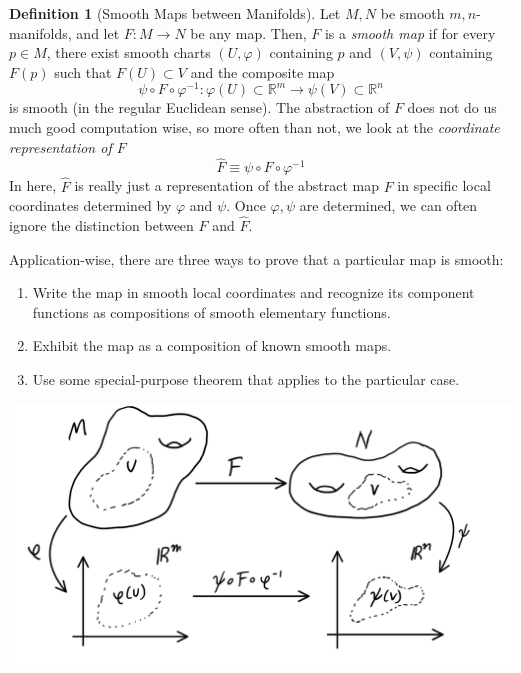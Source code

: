 \documentclass{article}
\theoremstyle{remark}
\theoremstyle{definition}
\newtheorem{definition}{Definition}[section]
\begin{document}
\begin{definition}[Smooth Maps between Manifolds]
Let $M, N$ be smooth $m, n$-manifolds, and let $F: M \longrightarrow N$ be any map. Then, $F$ is a \textit{smooth map} if for every $p \in M$, there exist smooth charts $(U, \varphi)$ containing $p$ and $(V, \psi)$ containing $F(p)$ such that $F(U) \subset V$ and the composite map 
\[\psi \circ F \circ \varphi^{-1}: \varphi(U) \subset \mathbb{R}^m \longrightarrow \psi(V) \subset \mathbb{R}^n\]
is smooth (in the regular Euclidean sense). The abstraction of $F$ does not do us much good computation wise, so more often than not, we look at the \textit{coordinate representation of $F$}
\[\hat{F} \equiv \psi \circ F \circ \varphi^{-1}\]
In here, $\hat{F}$ is really just a representation of the abstract map $F$ in specific local coordinates determined by $\varphi$ and $\psi$. Once $\varphi, \psi$ are determined, we can often ignore the distinction between $F$ and $\hat{F}$. 

Application-wise, there are three ways to prove that a particular map is smooth: 
\begin{enumerate}
    \item Write the map in smooth local coordinates and recognize its component functions as compositions of smooth elementary functions. 
    \item Exhibit the map as a composition of known smooth maps. 
    \item Use some special-purpose theorem that applies to the particular case. 
\end{enumerate}
\begin{center}
    \includegraphics[scale=0.25]{img/Functions_between_Manifolds.PNG}
\end{center}
\end{definition}
\end{document}

